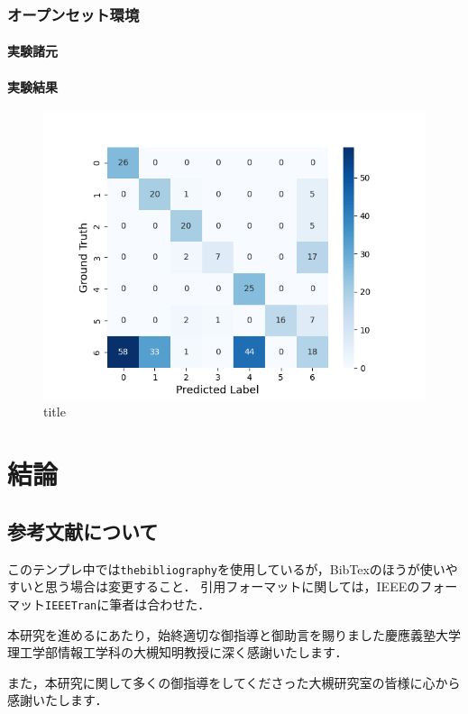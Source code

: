 \subsection{オープンセット環境}
\subsubsection{実験諸元}
\subsubsection{実験結果}
\begin{figure}[H]
  \begin{center}
  \includegraphics[width=\linewidth]{./fig/noisy_dataset/cross_val_Fold0_threshold0.7_6_6.png}
  \end{center}
\caption{title}
\end{figure}
  

\chapter{結論}

\section{参考文献について}
このテンプレ中では{\tt thebibliography}を使用しているが，BibTexのほうが使いやすいと思う場合は変更すること．
引用フォーマットに関しては，IEEEのフォーマット{\tt IEEETran}に筆者は合わせた．

\begin{acknowledgment}

本研究を進めるにあたり，始終適切な御指導と御助言を賜りました慶應義塾大学理工学部情報工学科の大槻知明教授に深く感謝いたします．

また，本研究に関して多くの御指導をしてくださった大槻研究室の皆様に心から感謝いたします．


\end{acknowledgment}


